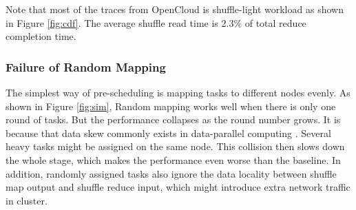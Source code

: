 


Note that most of the traces from OpenCloud is shuffle-light workload as shown in Figure \ref{fig:cdf}. The average shuffle read time is 2.3\% of total reduce completion time.

\subsubsection{Failure of Random Mapping}\label{randomassign}
The simplest way of pre-scheduling is mapping tasks to different nodes evenly.  As shown in Figure \ref{fig:sim}, Random mapping works well when there is only one round of tasks. But the performance collapses as the round number grows. It is because that data skew commonly exists in data-parallel computing \cite{skewtune, reining, gufler2012load}. Several heavy tasks might be assigned on the same node. This collision then slows down the whole stage, which makes the performance even worse than the baseline. In addition, randomly assigned tasks also ignore the data locality between shuffle map output and shuffle reduce input, which might introduce extra network traffic in cluster.



